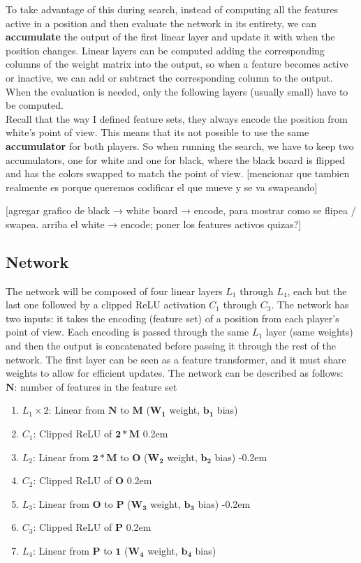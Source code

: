 To take advantage of this during search, instead of computing all the features active in a position and then evaluate the network in its entirety, we can \textbf{accumulate} the output of the first linear layer and update it with when the position changes. Linear layers can be computed adding the corresponding columns of the weight matrix into the output, so when a feature becomes active or inactive, we can add or subtract the corresponding column to the output. When the evaluation is needed, only the following layers (usually small) have to be computed. \\

Recall that the way I defined feature sets, they always encode the position from white's point of view. This means that its not possible to use the same \textbf{accumulator} for both players. So when running the search, we have to keep two accumulators, one for white and one for black, where the black board is flipped and has the colors swapped to match the point of view.
[mencionar que tambien realmente es porque queremos codificar el que mueve y se va swapeando]

[agregar grafico de black → white board → encode, para mostrar como se flipea / swapea. arriba el white → encode; poner los features activos quizas?]

\subsection{Network}

The network will be composed of four linear layers $L_1$ through $L_4$, each but the last one followed by a clipped ReLU activation $C_1$ through $C_3$. The network has two inputs: it takes the encoding (feature set) of a position from each player's point of view. Each encoding is passed through the same $L_1$ layer (same weights) and then the output is concatenated before passing it through the rest of the network. The first layer can be seen as a feature transformer, and it must share weights to allow for efficient updates. The network can be described as follows: \\

$\bm{N}$: number of features in the feature set

\begin{enumerate}
\itemsep-0.2em
\item $L_1 \times 2$: Linear from $\bm{N}$ to $\bm{M}$ ($\bm{W_1}$ weight, $\bm{b_1}$ bias)
\item $C_1$: Clipped ReLU of $\bm{2 * M}$
\itemsep0.2em
\item $L_2$: Linear from $\bm{2 * M}$ to $\bm{O}$ ($\bm{W_2}$ weight, $\bm{b_2}$ bias)
\itemsep-0.2em
\item $C_2$: Clipped ReLU of $\bm{O}$
\itemsep0.2em
\item $L_3$: Linear from $\bm{O}$ to $\bm{P}$ ($\bm{W_3}$ weight, $\bm{b_3}$ bias)
\itemsep-0.2em
\item $C_3$: Clipped ReLU of $\bm{P}$
\itemsep0.2em
\item $L_4$: Linear from $\bm{P}$ to $\bm{1}$ ($\bm{W_4}$ weight, $\bm{b_4}$ bias)
\end{enumerate}


